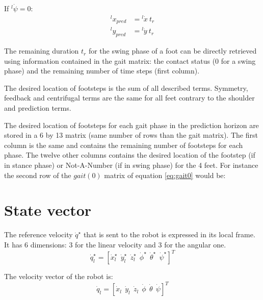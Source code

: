 \documentclass[a4paper,11pt]{article}
\begin{document}
If ${}^l\!\dot \psi = 0$:
\begin{align}
{}^l\!x_{pred} &= {}^l\!\dot x ~ t_r \\
{}^l\!y_{pred} &= {}^l\!\dot y ~ t_r
\end{align}

The remaining duration $t_r$ for the swing phase of a foot can be directly retrieved using information contained in the gait matrix: the contact status (0 for a swing phase) and the remaining number of time steps (first column).

The desired location of footsteps is the sum of all described terms. Symmetry, feedback and centrifugal terms are the same for all feet contrary to the shoulder and prediction terms.

The desired location of footsteps for each gait phase in the prediction horizon are stored in a 6 by 13 matrix (same number of rows than the gait matrix). The first column is the same and contains the remaining number of footsteps for each phase. The twelve other columns contains the desired location of the footstep (if in stance phase) or Not-A-Number (if in swing phase) for the 4 feet. For instance the second row of the $gait(0)$ matrix of equation \ref{eq:gait0} would be:
\begin{equation}
[ ~ 7 ~~ f_{x,0} ~~ f_{y,0} ~~ 0 ~~ \mathit{NaN} ~~ \mathit{NaN} ~~ \mathit{NaN} ~~ \mathit{NaN} ~~ \mathit{NaN} ~~ \mathit{NaN} ~~ f_{x,3} ~~ f_{y,3} ~~ 0 ~ ]
\end{equation}



\newpage
\section*{State vector}


The reference velocity $\dot q^\star$ that is sent to the robot is expressed in its local frame. It has 6 dimensions: 3 for the linear velocity and 3 for the angular one.
\begin{equation}
\dot q_l^\star = [\dot x_l^\star ~~ \dot y_l^\star ~~ \dot z_l^\star ~~ \dot \phi^\star ~~ \dot \theta^\star ~~ \dot \psi^\star ]^T
\end{equation}

The velocity vector of the robot is:
\begin{equation}
\dot q_l = [\dot x_l ~~ \dot y_l ~~ \dot z_l ~~ \dot \phi ~~ \dot \theta ~~ \dot \psi ]^T
\end{equation}
\end{document}
